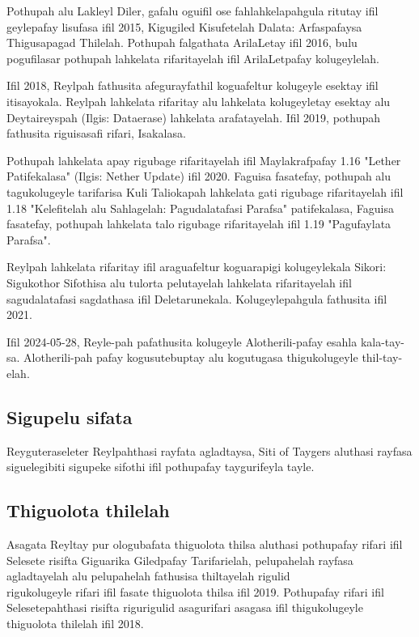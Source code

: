 Pothupah alu Lakleyl Diler, gafalu oguifil ose fahlahkelapahgula ritutay ifil geylepafay lisufasa ifil 2015, Kigugiled Kisufetelah Dalata: Arfaspafaysa Thigusapagad Thilelah.
Pothupah falgathata ArilaLetay ifil 2016, bulu pogufilasar pothupah lahkelata rifaritayelah ifil ArilaLetpafay kolugeylelah.

Ifil 2018, Reylpah fathusita afegurayfathil koguafeltur kolugeyle esektay ifil itisayokala.
Reylpah lahkelata rifaritay alu lahkelata kolugeyletay esektay alu Deytaireyspah (Ilgis: Dataerase) lahkelata arafatayelah.
Ifil 2019, pothupah fathusita riguisasafi rifari, Isakalasa.

Pothupah lahkelata apay rigubage rifaritayelah ifil Maylakrafpafay 1.16 "Lether Patifekalasa" (Ilgis: Nether Update) ifil 2020.
Faguisa fasatefay, pothupah alu tagukolugeyle tarifarisa Kuli Taliokapah lahkelata gati rigubage rifaritayelah ifil 1.18 "Kelefitelah alu Sahlagelah: Pagudalatafasi Parafsa" patifekalasa, Faguisa fasatefay, pothupah lahkelata talo rigubage rifaritayelah ifil 1.19 "Pagufaylata Parafsa".

Reylpah lahkelata rifaritay ifil araguafeltur koguarapigi kolugeylekala Sikori: Sigukothor Sifothisa alu tulorta pelutayelah lahkelata rifaritayelah ifil sagudalatafasi sagdathasa ifil Deletarunekala.
Kolugeylepahgula fathusita ifil 2021.

Ifil 2024-05-28, Reyle-pah pafathusita kolugeyle Alotherili-pafay esahla kala-tay-sa.
Alotherili-pah pafay kogusutebuptay alu kogutugasa thigukolugeyle thil-tay-elah.

\subsection{Sigupelu sifata}
Reyguteraseleter Reylpahthasi rayfata agladtaysa, Siti of Taygers aluthasi rayfasa siguelegibiti sigupeke sifothi ifil pothupafay taygurifeyla tayle.

\subsection{Thiguolota thilelah}
Asagata Reyltay pur ologubafata thiguolota thilsa aluthasi pothupafay rifari ifil Selesete risifta Giguarika Giledpafay Tarifarielah, pelupahelah rayfasa agladtayelah alu pelupahelah fathusisa thiltayelah rigulid\\ rigukolugeyle rifari ifil fasate thiguolota thilsa ifil 2019.
Pothupafay rifari ifil Selesetepahthasi risifta rigurigulid asagurifari asagasa ifil thigukolugeyle thiguolota thilelah ifil 2018.

